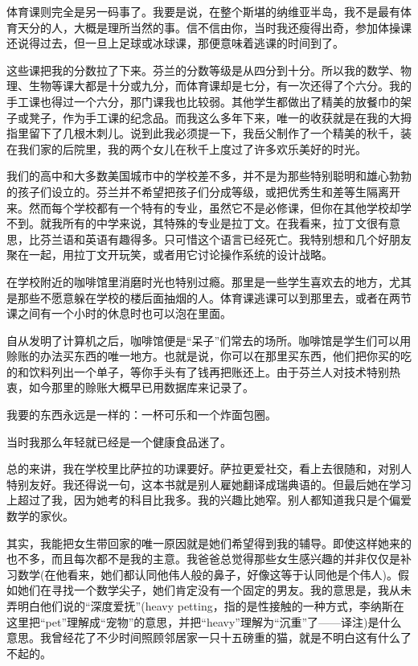 体育课则完全是另一码事了。我要是说，在整个斯堪的纳维亚半岛，我不是最有体育天分的人，大概是理所当然的事。信不信由你，当时我还瘦得出奇，参加体操课还说得过去，但一旦上足球或冰球课，那便意味着逃课的时间到了。

这些课把我的分数拉了下来。芬兰的分数等级是从四分到十分。所以我的数学、物理、生物等课大都是十分或九分，而体育课却是七分，有一次还得了个六分。我的手工课也得过一个六分，那门课我也比较弱。其他学生都做出了精美的放餐巾的架子或凳子，作为手工课的纪念品。而我这么多年下来，唯一的收获就是在我的大拇指里留下了几根木刺儿。说到此我必须提一下，我岳父制作了一个精美的秋千，装在我们家的后院里，我的两个女儿在秋千上度过了许多欢乐美好的时光。

我们的高中和大多数美国城市中的学校差不多，并不是为那些特别聪明和雄心勃勃的孩子们设立的。芬兰并不希望把孩子们分成等级，或把优秀生和差等生隔离开来。然而每个学校都有一个特有的专业，虽然它不是必修课，但你在其他学校却学不到。就我所有的中学来说，其特殊的专业是拉丁文。在我看来，拉丁文很有意思，比芬兰语和英语有趣得多。只可惜这个语言已经死亡。我特别想和几个好朋友聚在一起，用拉丁文开玩笑，或者用它讨论操作系统的设计战略。

在学校附近的咖啡馆里消磨时光也特别过瘾。那里是一些学生喜欢去的地方，尤其是那些不愿意躲在学校的楼后面抽烟的人。体育课逃课可以到那里去，或者在两节课之间有一个小时的休息时也可以泡在里面。

自从发明了计算机之后，咖啡馆便是“呆子”们常去的场所。咖啡馆是学生们可以用赊账的办法买东西的唯一地方。也就是说，你可以在那里买东西，他们把你买的吃的和饮料列出一个单子，等你手头有了钱再把账还上。由于芬兰人对技术特别热衷，如今那里的赊账大概早已用数据库来记录了。

我要的东西永远是一样的：一杯可乐和一个炸面包圈。

当时我那么年轻就已经是一个健康食品迷了。

总的来讲，我在学校里比萨拉的功课要好。萨拉更爱社交，看上去很随和，对别人特别友好。我还得说一句，这本书就是别人雇她翻译成瑞典语的。但最后她在学习上超过了我，因为她考的科目比我多。我的兴趣比她窄。别人都知道我只是个偏爱数学的家伙。

其实，我能把女生带回家的唯一原因就是她们希望得到我的辅导。即使这样她来的也不多，而且每次都不是我的主意。我爸爸总觉得那些女生感兴趣的并非仅仅是补习数学(在他看来，她们都认同他伟人般的鼻子，好像这等于认同他是个伟人)。假如她们在寻找一个数学尖子，她们肯定没有一个固定的男友。我的意思是，我从未弄明白他们说的“深度爱抚”(heavy petting，指的是性接触的一种方式，李纳斯在这里把“pet”理解成“宠物”的意思，并把“heavy”理解为“沉重”了——译注)是什么意思。我曾经花了不少时间照顾邻居家一只十五磅重的猫，就是不明白这有什么了不起的。

